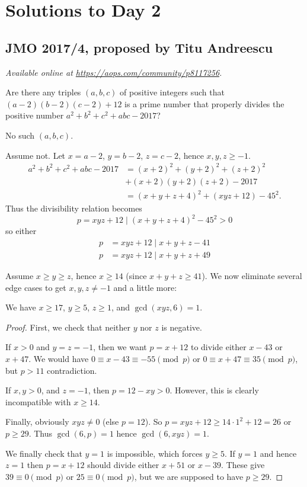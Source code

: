 \documentclass[11pt]{scrartcl}
\begin{document}
\section{Solutions to Day 2}
\subsection{JMO 2017/4, proposed by Titu Andreescu}
\textsl{Available online at \url{https://aops.com/community/p8117256}.}
\begin{mdframed}[style=mdpurplebox,frametitle={Problem statement}]
Are there any triples $(a,b,c)$ of positive integers such that
$(a-2)(b-2)(c-2)+12$ is a prime number
that properly divides the positive number
$a^2+b^2+c^2+abc-2017$?
\end{mdframed}
No such $(a,b,c)$.

Assume not.
Let $x=a-2$, $y=b-2$, $z=c-2$, hence $x,y,z \ge -1$.
\begin{align*}
  a^2+b^2+c^2+abc-2017
  &= (x+2)^2 + (y+2)^2 + (z+2)^2 \\ &
  + (x+2)(y+2)(z+2) - 2017 \\
  &= (x+y+z+4)^2 + (xyz+12) - 45^2.
\end{align*}
Thus the divisibility relation becomes
\[ p = xyz+12 \mid \left( x+y+z+4 \right)^2 - 45^2 > 0 \]
so either
\begin{align*}
  p &= xyz+12 \mid x+y+z-41 \\
  p &= xyz+12 \mid x+y+z+49
\end{align*}

Assume $x \ge y \ge z$, hence $x \ge 14$ (since $x+y+z \ge 41$).
We now eliminate several edge cases
to get $x,y,z \neq -1$ and a little more:
\begin{claim*}
  We have $x \ge 17$, $y \ge 5$, $z \ge 1$, and $\gcd(xyz, 6) = 1$.
\end{claim*}
\begin{proof}
  First, we check that neither $y$ nor $z$ is negative.
  \begin{itemize}
  \ii If $x > 0$ and $y=z=-1$, then we want $p=x+12$
  to divide either $x-43$ or $x+47$.
  We would have $0 \equiv x-43 \equiv -55 \pmod p$
  or $0\equiv x+47 \equiv 35 \pmod p$,
  but $p > 11$ contradiction.

  \ii If $x, y > 0$, and $z = -1$, then $p = 12-xy > 0$.
  However, this is clearly incompatible with $x \ge 14$.
  \end{itemize}
  Finally, obviously $xyz \neq 0$ (else $p=12$).
  So $p = xyz + 12 \ge 14 \cdot 1^2 +12 = 26$ or $p \ge 29$.
  Thus $\gcd(6,p) = 1$ hence $\gcd(6,xyz)=1$.

  We finally check that $y=1$ is impossible, which forces $y \ge 5$.
  If $y=1$ and hence $z=1$ then $p=x+12$ should divide either
  $x+51$ or $x-39$.
  These give $39 \equiv 0 \pmod p$ or $25 \equiv 0 \pmod p$,
  but we are supposed to have $p \ge 29$.
\end{proof}
\end{document}
